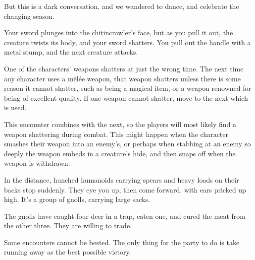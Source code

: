 \begin{multicols}{2}
\begin{speechtext}
	But this is a dark conversation, and we wandered to dance, and celebrate the changing season.

\end{speechtext}


\begin{boxtext}

	Your sword plunges into the chitincrawler's face, but as you pull it out, the creature twists its body, and your sword shatters.
	You pull out the handle with a metal stump, and the next creature attacks.

\end{boxtext}

One of the characters' weapons shatters at just the wrong time.
The next time any character uses a m\^el\'ee weapon, that weapon shatters unless there is some reason it cannot shatter, such as being a magical item, or a weapon renowned for being of excellent quality.
If one weapon cannot shatter, move to the next which is used.

This encounter combines with the next, so the players will most likely find a weapon shattering during combat.
This might happen when the character smashes their weapon into an enemy's, or perhaps when stabbing at an enemy so deeply the weapon embeds in a creature's hide, and then snaps off when the weapon is withdrawn.


\begin{boxtext}

	In the distance, hunched humanoids carrying spears and heavy loads on their backs stop suddenly.
	They eye you up, then come forward, with ears pricked up high.
	It's a group of gnolls, carrying large sacks.

\end{boxtext}

The gnolls have caught four deer in a trap, eaten one, and cured the meat from the other three.  They are willing to trade.



Some encounters cannot be bested. The only thing for the party to do is take running away as the best possible victory.


\end{multicols}
